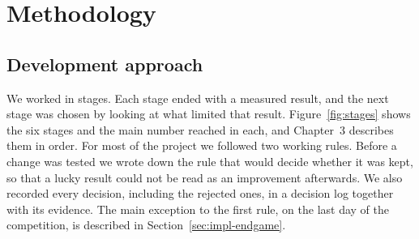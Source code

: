 \section{Methodology}
\label{sec:methodology}

\subsection{Development approach}

We worked in stages. Each stage ended with a measured result, and the next stage was chosen by looking at what limited that result. Figure~\ref{fig:stages} shows the six stages and the main number reached in each, and Chapter~3 describes them in order. For most of the project we followed two working rules. Before a change was tested we wrote down the rule that would decide whether it was kept, so that a lucky result could not be read as an improvement afterwards. We also recorded every decision, including the rejected ones, in a decision log together with its evidence. The main exception to the first rule, on the last day of the competition, is described in Section~\ref{sec:impl-endgame}.

